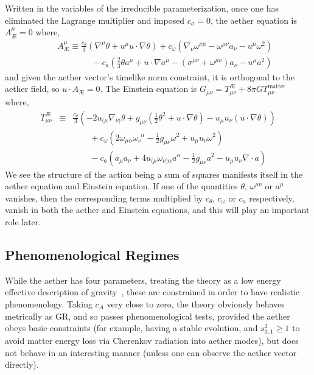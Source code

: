 \documentclass[12pt]{article}
\numberwithin{equation}{section}
\newcommand{\nl}{\nonumber \\}
\begin{document}
Written in the variables of the irreducible parameterization, once one has eliminated the Lagrange multiplier and imposed $c_\sigma = 0$, the aether equation is $A_{\text{\AE}}^\mu = 0$ where,
\begin{eqnarray}
\label{eq:aethereq}
&& A_{\text{\AE}}^\mu \equiv \frac{c_\theta}{3} \left( \nabla^\mu \theta +  u^\mu u \cdot \nabla \theta \right)
+ c_\omega \left( \nabla_\nu \omega^{\nu\mu} -  \omega^{\mu\nu} a_\nu -  u^\mu \omega^2 \right)
    \nl
 && \qquad \qquad
 - c_a \left( \frac{2}{3} \theta a^\mu + u \cdot \nabla a^\mu - \left( \sigma^{\mu\nu} + \omega^{\mu\nu} \right) a _\nu - u^\mu a^2  \right) 
\end{eqnarray}
and given the aether vector's timelike norm constraint, it is orthogonal to the aether field, so $u \cdot A_{\text{\AE}} = 0$. The Einstein equation is $G_{\mu\nu} = T^{\text{\AE}}_{\mu\nu} + 8 \pi G T^{\mathrm{matter}}_{\mu\nu}$ where,
\begin{eqnarray}
\label{eq:Einsteineq}
T^{\text{\AE}}_{\mu\nu} & \equiv & \frac{c_\theta}{3} \left( - 2 u_{(\mu} \nabla_{\nu)} \theta +g_{\mu\nu} \left( \frac{1}{2} \theta^2 + u \cdot \nabla \theta \right) -  u_\mu u_\nu ( u \cdot \nabla \theta ) \right) \nl
&& \qquad + c_\omega \left( 2 \omega_{\mu\alpha} \omega_{\nu}^{~~\alpha} - \frac{1}{2} g_{\mu\nu} \omega^2 +  u_\mu u_\nu \omega^2 \right) \nl
&& \qquad - c_a \left( a_\mu a_\nu + 4 u_{(\mu} \omega_{\nu) \alpha} a^\alpha - \frac{1}{2} g_{\mu\nu} a^2 -  u_\mu u_\nu \nabla \cdot a \right)
\end{eqnarray}
We see the structure of the action being a sum of squares manifests itself in the aether equation and Einstein equation. If one of the quantities $\theta$, $\omega^{\mu\nu}$ or $a^\mu$ vanishes, then the corresponding terms multiplied by $c_\theta$,  $c_\omega$ or $c_a$ respectively, vanish in both the aether and Einstein equations, and this will play an important role later.



\subsection{Phenomenological Regimes}
\label{sec:phenoregimes}


While the aether has four parameters, treating the theory as a low energy effective description of gravity~\cite{Withers:2009qg}, these are constrained in order to have realistic phenomenology. 
Taking $c_A$ very close to zero, the theory obviously behaves metrically as GR, and so passes phenomenological tests, provided the aether obeys basic constraints (for example, having a stable evolution, and $s_{0,1}^2 \ge 1$ to avoid matter energy loss via Cherenkov radiation into aether modes), but does not behave in an interesting manner (unless one can observe the aether vector directly).
\end{document}
